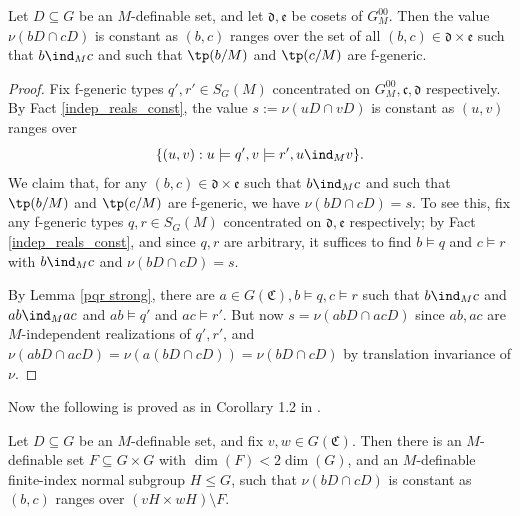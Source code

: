 \documentclass[10pt]{article}
\begin{document}
{\begin{lemma}\label{const_on_generics}
Let $D\subseteq G$ be an $M$-definable set, and let $\mathfrak{d},\mathfrak{e}$ be cosets of $G^{00}_M$. Then the value $\nu(bD\cap cD)$ is constant as $(b,c)$ ranges over the set of all $(b,c)\in\mathfrak{d}\times\mathfrak{e}$ such that $b\ind_M c$ and such that $\tp(b/M)$ and $\tp(c/M)$ are f-generic.
\end{lemma}
\begin{proof}
Fix f-generic types $q',r'\in S_G(M)$ concentrated on $G^{00}_M,\mathfrak{c},\mathfrak{d}$ respectively. By Fact \ref{indep_reals_const}, the value $s:=\nu(uD\cap vD)$ is constant as $(u,v)$ ranges over $$\{(u,v):u\models q',v\models r',u\ind_M v\}.$$ We claim that, for any $(b,c)\in\mathfrak{d}\times\mathfrak{e}$ such that $b\ind_M c$ and such that $\tp(b/M)$ and $\tp(c/M)$ are f-generic, we have $\nu(bD\cap cD)=s$. To see this, fix any f-generic types $q,r\in S_G(M)$ concentrated on $\mathfrak{d},\mathfrak{e}$ respectively; by Fact \ref{indep_reals_const}, and since $q,r$ are arbitrary, it suffices to find $b\models q$ and $c\models r$ with $b\ind_M c$ and $\nu(bD\cap cD)=s$.

By Lemma \ref{pqr strong}, there are $a\in G(\mathfrak{C}),b\models q,c\models r$ such that $b\ind_Mc$ and $ab\ind_M ac$ and $ab\models q'$ and $ac\models r'$. But now $s=\nu(abD\cap acD)$ since $ab,ac$ are $M$-independent realizations of $q',r'$, and $\nu(abD\cap acD)=\nu(a(bD\cap cD))=\nu(bD\cap cD)$ by translation invariance of $\nu$.
\end{proof}

Now the following is proved as in Corollary 1.2 in \cite{pillay_starchenko}.

\begin{lemma}\label{HF_fixed_cosets}
    Let $D\subseteq G$ be an $M$-definable set, and fix $v,w\in G(\mathfrak{C})$. Then there is an $M$-definable set $F\subseteq G\times G$ with $\dim(F)<2\dim(G)$, and an $M$-definable finite-index normal subgroup $H\leqslant G$, such that $\nu(bD\cap cD)$ is constant as $(b,c)$ ranges over $(vH\times wH)\setminus F$.
\end{lemma}

}
\end{document}
